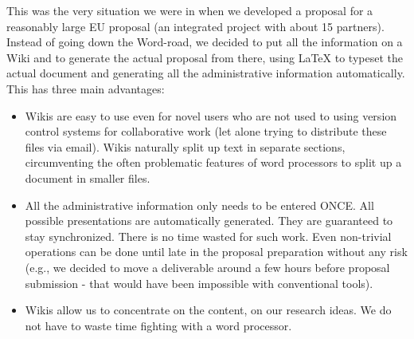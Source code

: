 \documentclass[a4paper,10pt,english]{sphinxmanual}
\begin{document}
This was the very situation we were in when we developed a proposal for a reasonably large EU proposal (an integrated project with about 15 partners). Instead of going down the Word-road, we decided to put all the information on a Wiki and to generate the actual proposal from there, using LaTeX to typeset the actual document and generating all the administrative information automatically. This has three main advantages:
\begin{itemize}
\item {} 
Wikis are easy to use even for novel users who are not used to using version control systems for collaborative work (let alone trying to distribute these files via email). Wikis naturally split up text in separate sections, circumventing the often problematic features of word processors to split up a document in smaller files.

\item {} 
All the administrative information only needs to be entered ONCE. All possible presentations are automatically generated. They are guaranteed to stay synchronized. There is no time wasted for such work. Even non-trivial operations can be done until late in the proposal preparation without any risk (e.g., we decided to move a deliverable around a few hours before proposal submission - that would have been impossible with conventional tools).

\item {} 
Wikis allow us to concentrate on the content, on our research ideas. We do not have to waste time fighting with a word processor.

\end{itemize}
\end{document}
